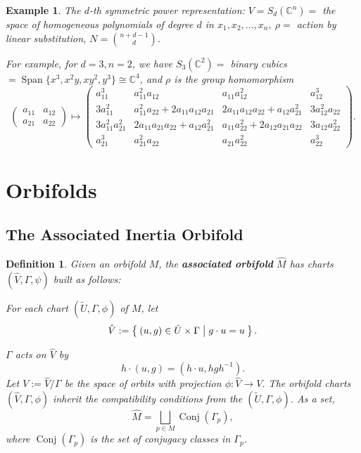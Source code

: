 \documentclass{article}
\newtheorem{defn}[theorem]{Definition\rm}
\newtheorem{example}{Example}
\newcommand{\ra}{\rightarrow}
\newcommand{\CC}{\mathbb{C}}
\DeclareMathOperator{\Span}{Span}
\DeclareMathOperator{\Conj}{Conj}
\begin{document}
	\begin{example}
		The $d$-th symmetric power representation: $V = S_{d}(\CC^{n}) =$ the space of homogeneous polynomials of degree $d$ in $x_{1}, x_{2}, \ldots, x_{n},\ \rho =$ action by linear substitution, $N = \binom{n + d -1}{d}$.
		
		For example, for $d = 3, n = 2$, we have $S_{3}(\CC^{2}) =$ binary cubics $=\Span\{x^{3}, x^{2}y, xy^{2}, y^{3}\} \cong \CC^{4}$, and $\rho$ is the group homomorphism
		\begin{equation*}
			\begin{pmatrix}
				a_{11} & a_{12} \\ 
				a_{21} & a_{22}
			\end{pmatrix}
			\mapsto
			\begin{pmatrix}
				a_{11}^{3} & a_{11}^{2}a_{12} & a_{11}a_{12}^{2} & a_{12}^{3} \\
				3a_{11}^{2} & a_{11}^{2}a_{22} + 2a_{11}a_{12}a_{21} & 2a_{11}a_{12}a_{22} + a_{12}a_{21}^{2} & 3a_{12}^{2}a_{22} \\ 
				3a_{11}^{2}a_{21}^{2} & 2a_{11}a_{21}a_{22} + a_{12}a_{21}^{2} & a_{11}a_{22}^{2} + 2a_{12}a_{21}a_{22} & 3a_{12}a_{22}^{2} \\ 
				a_{21}^{3} & a_{21}^{2}a_{22} & a_{21}a_{22}^{2} & a_{22}^{3}
			\end{pmatrix}.
		\end{equation*}
	\end{example}
	
	\section{Orbifolds}
	\subsection{The Associated Inertia Orbifold}
	
	\begin{defn}
		Given an orbifold $M$, the \textbf{associated orbifold} $\hat{M}$ has charts $(\hat{V}, \Gamma, \psi)$ built as follows:
		
		For each chart $(\tilde{U}, \Gamma, \phi)$ of $M$, let
		\begin{equation*}
			\hat{V} := \Set{(u,g) \in \tilde{U} \times \Gamma | g \cdot u = u }.
		\end{equation*}
	
	$\Gamma$ acts on $\hat{V}$ by
	\begin{equation*}
		h \cdot (u,g) = (h \cdot u, hgh^{-1}).
	\end{equation*}
	Let $V := \hat{V}/\Gamma$ be the space of orbits with projection $\phi : \hat{V} \ra V$. The orbifold charts $(\hat{V}, \Gamma, \phi)$ inherit the compatibility conditions from the $(\tilde{U}, \Gamma, \phi)$. As a set,
	\begin{equation*}
		\hat{M} = \bigsqcup_{p \in M} \Conj(\Gamma_{p}),
	\end{equation*}
	where $\Conj(\Gamma_{p})$ is the set of conjugacy classes in $\Gamma_{p}$.
	\end{defn}
\end{document}
